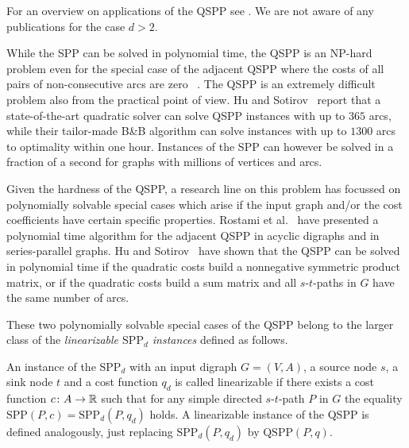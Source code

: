 For an overview on applications of the QSPP see \cite{huSo2020,rostami2018}.
We are not  aware of any
publications  
for the case $d>2$.


While the SPP can be solved in polynomial time, the QSPP is an NP-hard
problem even for the special case of the adjacent QSPP where  the  costs of all pairs of non-consecutive  arcs are  
zero ~\cite{rostami2018}.
The QSPP is  an  extremely difficult
problem also from the practical point of view.  
 Hu and Sotirov~\cite{huSo2020} report that a state-of-the-art quadratic solver can
solve QSPP instances with up to $365$ arcs, while their  tailor-made B\&B
algorithm can solve instances with up to $1300$ arcs to optimality within one  hour. 
Instances of the SPP can however be solved in a fraction of a second for graphs with
millions of vertices and arcs.

\smallskip

Given the 
hardness of the QSPP, a research line on this problem has focussed
on 
polynomially solvable special cases which
arise if the input graph and/or the cost coefficients have certain specific
properties. Rostami et al.~\cite{rostami2015} have presented a polynomial time
algorithm for the adjacent QSPP in acyclic digraphs and in series-parallel graphs. Hu 
and Sotirov~\cite{huSo2018}
have shown that the QSPP can be solved in polynomial time if the  quadratic
costs build a  nonnegative symmetric product matrix, or if the quadratic costs
build a sum matrix and all $s$-$t$-paths in 
$G$ have the same number of arcs. 
\smallskip

These two polynomially solvable
special cases of the QSPP belong to the larger class of the \emph{linearizable $\text{SPP}_d$ instances} defined as follows.
\begin{definition}
\label{def:linearizable}
 An instance of the SPP$_d$ with an input digraph $G=(V,A)$, a source node $s$, a sink node $t$
 and a  cost function $q_d$ is called linearizable if there exists a cost function
 $c\colon A\to \mathbb{R}$ such that for any simple directed $s$-$t$-path  $P$ in $G$ the equality
 $\text{SPP}(P,c) = \text{SPP}_d(P,q_d)$ holds.
  A linearizable instance  of the  QSPP is defined analogously, just  replacing $\text{SPP}_d(P,q_d)$ by $\text{QSPP}(P,q)$.
\end{definition}

